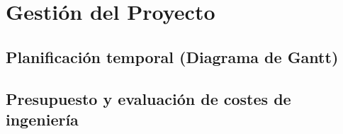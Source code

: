 \chapter{Gestión del Proyecto}

\section{Planificación temporal (Diagrama de Gantt)}

\section{Presupuesto y evaluación de costes de ingeniería}